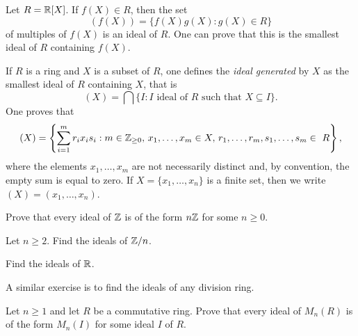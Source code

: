 \begin{example}
Let $R=\mathbb{R}[X]$. If $f(X)\in R$, then the set 
\[
(f(X))=\{f(X)g(X):g(X)\in R\}
\]
of multiples of $f(X)$ is an ideal of $R$. One can prove that this is the smallest 
ideal of $R$ containing $f(X)$.  	
\end{example}

If $R$ is a ring and $X$ is a subset of $R$, one defines
the \emph{ideal generated} by $X$ as the smallest ideal of $R$ containing $X$, that is 
\[
(X)=\bigcap\{I:\text{$I$ ideal of $R$ such that $X\subseteq I$}\}.
\]
One proves that 
\[
(X)=\left\{\sum_{i=1}^mr_ix_is_i:m\in\Z_{\geq0},\,x_1,\dots,x_m\in X,\,r_1,\dots,r_m,s_1,\dots,s_m\in R\right\}, 
\]
where the elements $x_1,\dots,x_m$ are not necessarily distinct and, by
convention, the empty sum is equal to zero. If $X=\{x_1,\dots,x_n\}$ is a
finite set, then we write $(X)=(x_1,\dots,x_n)$. 

\begin{exercise}
\label{xca:ideals_Z}
Prove that every ideal of $\mathbb{Z}$ is of the form $n\mathbb{Z}$ for some $n\geq0$. 	
\end{exercise}

\begin{exercise}
\label{xca:ideals_Zn}
Let $n\geq2$. Find the ideals of $\mathbb{Z}/n$. 	
\end{exercise}

\begin{exercise}
\label{xca:ideals_R}
Find the ideals of $\mathbb{R}$.	
\end{exercise}

A similar exercise is to find the ideals of any division ring.  

\begin{exercise}
\label{xca:ideals_matrices}
    Let $n\geq1$ and let $R$ be a commutative ring. Prove that every ideal of
    $M_n(R)$ is of the form $M_n(I)$ for some ideal $I$ of $R$. 
\end{exercise}

%    
%    



